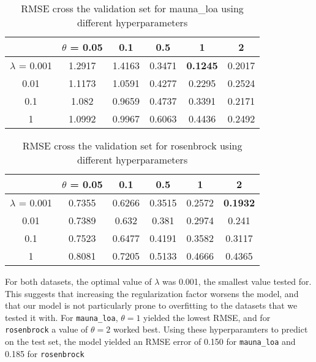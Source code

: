 \begin{table}[H]
\begin{center}
\begin{tabular}{|c|c|c|c|c|c|}
\hline
 & $\theta$ = 0.05 & 0.1 & 0.5 & 1 & 2 \\ \hline
 $\lambda$ = 0.001  & 1.2917 & 1.4163 & 0.3471 & \textbf{0.1245} & 0.2017\\ \hline
 0.01 & 1.1173 & 1.0591 & 0.4277 & 0.2295 & 0.2524\\ \hline
 0.1 & 1.082 & 0.9659 & 0.4737 & 0.3391 & 0.2171\\ \hline
 1 & 1.0992 & 0.9967 & 0.6063 & 0.4436 & 0.2492\\
 \hline
\end{tabular}
\caption{RMSE cross the validation set for mauna\_loa using different hyperparameters}
\end{center}
\end{table}

\begin{table}
\begin{center}
\begin{tabular}{|c|c|c|c|c|c|}
\hline
 & $\theta$ = 0.05 & 0.1 & 0.5 & 1 & 2 \\ \hline
 $\lambda$ = 0.001  & 0.7355 & 0.6266 & 0.3515 & 0.2572 & \textbf{0.1932}\\ \hline
 0.01 & 0.7389 & 0.632 & 0.381 & 0.2974 & 0.241\\ \hline
 0.1 & 0.7523 & 0.6477 & 0.4191 & 0.3582 & 0.3117\\ \hline
 1 & 0.8081 & 0.7205 & 0.5133 & 0.4666 & 0.4365\\
 \hline
\end{tabular}
\caption{RMSE cross the validation set for rosenbrock using different hyperparameters}
\end{center}
\end{table}

For both datasets, the optimal value of $\lambda$ was 0.001, the smallest value tested for. This suggests that increasing the regularization factor worsens the model, and that our model is not particularly prone to overfitting to the datasets that we tested it with. For \verb+mauna_loa+, $\theta = 1$ yielded the lowest RMSE, and for \verb+rosenbrock+ a value of $\theta = 2$ worked best. Using these hyperparamters to predict on the test set, the model yielded an RMSE error of 0.150 for \verb+mauna_loa+ and 0.185 for \verb+rosenbrock+


